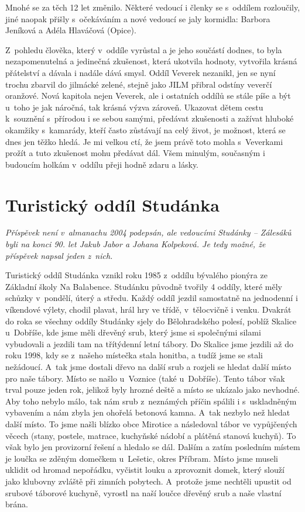 \documentclass[a5paper, 11pt, twoside]{article}
\begin{document}
Mnohé se za těch 12 let změnilo. Některé vedoucí i členky se s~oddílem
rozloučily, jiné naopak přišly s~očekáváním a nové vedoucí se jaly
kormidla: Barbora Jeníková a Adéla Hlaváčová (Opice).

Z~pohledu člověka, který v~oddíle vyrůstal a je jeho součástí dodnes, to
byla nezapomenutelná a jedinečná zkušenost, která ukotvila hodnoty,
vytvořila krásná přátelství a dávala i nadále dává smysl. Oddíl Veverek
nezanikl, jen se nyní trochu zbarvil do jilmácké zelené, stejně jako
JILM přibral odstíny veverčí oranžové. Nová kapitola nejen Veverek, ale
i ostatních oddílů se stále píše a být u~toho je jak náročná, tak krásná
výzva zároveň. Ukazovat dětem cestu k~souznění s~přírodou i se sebou
samými, předávat zkušenosti a zažívat hluboké okamžiky s~kamarády, kteří
často zůstávají na celý život, je možnost, která se dnes jen těžko
hledá. Je mi velkou ctí, že jsem právě toto mohla s~Veverkami prožít a
tuto zkušenost mohu předávat dál. Všem minulým, současným i budoucím
holkám v~oddílu přeji hodně zdaru a lásky.

\section{Turistický oddíl
Studánka}

\begin{center}
  \textit{Příspěvek není v~almanachu 2004 podepsán, ale vedoucími Studánky
  -- Zálesáků byli na konci 90. let Jakub Jabor a Johana Kolpeková. Je
  tedy možné, že příspěvek napsal jeden z~nich.}
\end{center}

\noindent
Turistický oddíl Studánka vznikl roku 1985 z~oddílu bývalého pionýra ze
Základní školy Na Balabence. Studánku původně tvořily 4 oddíly, které
měly schůzky v~pondělí, úterý a středu. Každý oddíl jezdil samostatně na
jednodenní i víkendové výlety, chodil plavat, hrál hry ve třídě,
v~tělocvičně i venku. Dvakrát do roka se všechny oddíly Studánky sjely do
Bělohradského polesí, poblíž Skalice u~Dobříše, kde jsme měli dřevěný
srub, který jsme si společnými silami vybudovali a jezdili tam na
třítýdenní letní tábory. Do Skalice jsme jezdili až do roku 1998, kdy se
z~našeho místečka stala honitba, a tudíž jsme se stali nežádoucí. A~tak
jsme dostali dřevo na další srub a rozjeli se hledat další místo pro
naše tábory. Místo se našlo u~Voznice (také u~Dobříše). Tento tábor však
trval pouze jeden rok, jelikož byly hrozné deště a místo se ukázalo jako
nevhodné. Aby toho nebylo málo, tak nám srub z~neznámých příčin spálili
i s~uskladněným vybavením a nám zbyla jen ohořelá betonová kamna. A~tak
nezbylo než hledat další místo. To jsme našli blízko obce Mirotice a
následoval tábor ve vypůjčených věcech (stany, postele, matrace,
kuchyňské nádobí a plátěná stanová kuchyň). To však bylo jen provizorní
řešení a hledalo se dál. Dalším a zatím posledním místem je loučka se
zděným domečkem u~Lešetic, okres Příbram. Místo jsme museli uklidit od
hromad nepořádku, vyčistit louku a zprovoznit domek, který slouží jako
klubovny zvláště při zimních pobytech. A~protože jsme nechtěli upustit
od srubové táborové kuchyně, vyrostl na naší loučce dřevěný srub a naše
vlastní brána.
\end{document}
